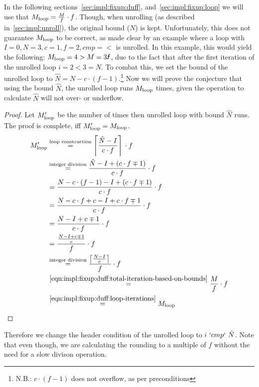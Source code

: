 In the following sections~\ref{sec:impl:fixup:duff}, and~\ref{sec:impl:fixup:loop} we will use that $M_{\text{loop}} = \frac{M}{f} \cdot f$.
Though, when unrolling (as described in~\cref{sec:impl:unroll}), the original bound ($N$) is kept.
Unfortunately, this does not guarantee $M_{\text{loop}}$ to be correct, as made clear by an example where a loop with $I = 0, N = 3, c = 1, f = 2, cmp = <$ is unrolled.
In this example, this would yield the following: $\Mloop = 4 > M = 3 \mLightning$, due to the fact that after the first iteration of the unrolled loop $i = 2 < 3 = N$.
To combat this, we set the bound of the unrolled loop to $\hat{N} = N - c \cdot (f - 1)$.\footnote{N.B.: $c \cdot (f - 1)$ does not overflow, as per preconditions}
Now we will prove the conjecture that using the bound $\hat{N}$, the unrolled loop runs $M_{\text{loop}}$ times, given the operation to calculate $\hat{N}$ will not over- or underflow.
\begin{proof}
    Let $M_{\text{loop}}'$ be the number of times then unrolled loop with bound $\hat{N}$ runs.
    The proof is complete, iff $M_{\text{loop}}' = M_{\text{loop}}$.
    \begin{align*}
        M_{\text{loop}}' &\overset{\text{loop construction}}{=} \left\lceil{}\frac{\hat{N} - I}{c \cdot f}\right\rceil{} \cdot f\\
        &\overset{\text{integer division}}{=} \frac{\hat{N} - I + (c \cdot f \mp 1)}{c \cdot f} \cdot f\\
        &= \frac{N - c \cdot (f - 1) - I + (c \cdot f \mp 1)}{c \cdot f} \cdot f\\
        &= \frac{N - c \cdot f + c - I + c \cdot f \mp 1}{c \cdot f} \cdot f\\
        &= \frac{N - I + c \mp 1}{c \cdot f} \cdot f\\
        &= \frac{\frac{N - I + c \mp 1}{c}}{f} \cdot f\\
        &\overset{\text{integer division}}{=} \frac{\left\lceil{}\frac{N - I}{c}\right\rceil{}}{f} \cdot f\\
        &\overset{\ref{eqn:impl:fixup:duff:total-iteration-based-on-bounds}}{=} \frac{M}{f} \cdot f\\
        &\overset{\ref{eqn:impl:fixup:duff:loop-iterations}}{=} M_{\text{loop}}
    \end{align*}
\end{proof}

Therefore we change the header condition of the unrolled loop to $i~`cmp`~\hat{N}$.
Note that even though, we are calculating the rounding to a multiple of $f$ without the need for a slow divison operation.


